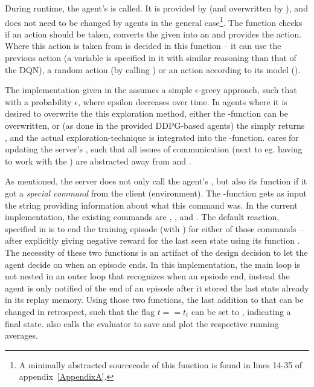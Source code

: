 During runtime, the agent's  is called. It is provided by  (and overwritten by ), and does not need to be changed by agents in the general case\footnote{A minimally abstracted sourcecode of this function is found in lines 14-35 of appendix~\ref{AppendixA}.}. The function checks if an action should be taken, converts the given  into an  and provides the action. Where this action is taken from is decided in this function -- it can use the previous action (a variable  is specified in it with similar reasoning than that of the DQN\cite{mnih_human-level_2015}), a random action (by calling ) or an action according to its model ().

The implementation given in the  assumes a simple $\epsilon$-greey approach, such that  with a probability $\epsilon$, where epsilon decreases over time. In agents where it is desired to overwrite the this exploration method, either the -function can be overwritten, or (as done in the provided DDPG-based agents) the  simply returns , and the actual exploration-technique is integrated into the -function. 
 cares for updating the server's , such that all issues of communication (next to eg. having to work with the ) are abstracted away from  and . 

As mentioned, the server does not only call the agent's , but also its function  if it got a \textit{special command} from the client (environment). The -function gets as input the string providing information about what this command was. In the current implementation, the existing commands are , ,  and  . The default reaction, specified in  is to end the training episode (with ) for either of those commands -- after explicitly giving negative reward for the last seen state using its function . The necessity of these two functions is an artifact of the design decision to let the agent decide on when an episode ends. In this implementation, the main loop is not nested in an outer loop that recognizes when an epsiode end, instead the agent is only notified of the end of an episode after it stored the last state already in its replay memory. Using those two functions, the last addition to that can be changed in retrospect, such that the flag $t == t_t$ can be set to , indicating a final state.  also calls the evaluator to save and plot the respective running averages.

